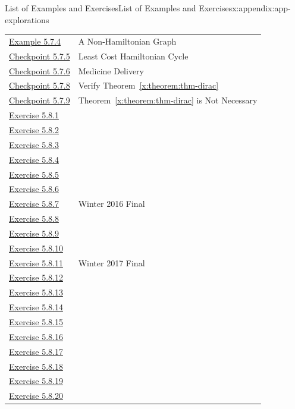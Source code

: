 \documentclass[oneside,10pt,]{book}
\newcommand{\xreffont}{\relax}
\numberwithin{equation}{section}
\begin{document}
\begin{appendixptx}{List of Examples and Exercises}{}{List of Examples and Exercises}{}{}{x:appendix:app-explorations}
\begin{longtable}[l]{ll}
\hyperref[x:example:eg-not-hamiltonian]{Example 5.7.4}& A Non-Hamiltonian Graph\\
\hyperref[x:exercise:ex-find-least-cost-hamiltonian]{Checkpoint 5.7.5}& Least Cost Hamiltonian Cycle\\
\hyperref[x:exercise:ex-hamiltonian-]{Checkpoint 5.7.6}& Medicine Delivery\\
\hyperref[x:exercise:ex-verify-dirac]{Checkpoint 5.7.8}& Verify Theorem~{\xreffont\ref*{x:theorem:thm-dirac}}\\
\hyperref[x:exercise:ex-hamiltonian-necessary]{Checkpoint 5.7.9}& Theorem~{\xreffont\ref*{x:theorem:thm-dirac}} is Not Necessary\\
\hyperlink{g:exercise:id551664}{Exercise 5.8.1}& \\
\hyperlink{g:exercise:id551642}{Exercise 5.8.2}& \\
\hyperlink{g:exercise:id551682}{Exercise 5.8.3}& \\
\hyperlink{g:exercise:id551738}{Exercise 5.8.4}& \\
\hyperlink{g:exercise:id551721}{Exercise 5.8.5}& \\
\hyperlink{g:exercise:id551780}{Exercise 5.8.6}& \\
\hyperlink{g:exercise:id551759}{Exercise 5.8.7}& Winter 2016 Final\\
\hyperlink{g:exercise:id551774}{Exercise 5.8.8}& \\
\hyperlink{g:exercise:id551794}{Exercise 5.8.9}& \\
\hyperlink{g:exercise:id551817}{Exercise 5.8.10}& \\
\hyperlink{g:exercise:id551807}{Exercise 5.8.11}& Winter 2017 Final\\
\hyperlink{g:exercise:id551802}{Exercise 5.8.12}& \\
\hyperlink{g:exercise:id551853}{Exercise 5.8.13}& \\
\hyperlink{g:exercise:id551871}{Exercise 5.8.14}& \\
\hyperlink{g:exercise:id551867}{Exercise 5.8.15}& \\
\hyperlink{g:exercise:id551900}{Exercise 5.8.16}& \\
\hyperlink{x:exercise:ex-any-isomorphic}{Exercise 5.8.17}& \\
\hyperlink{x:exercise:ex-complement-deg-sequence}{Exercise 5.8.18}& \\
\hyperlink{g:exercise:id551954}{Exercise 5.8.19}& \\
\hyperlink{g:exercise:id551962}{Exercise 5.8.20}& \\

\end{longtable}
\end{appendixptx}
\end{document}
